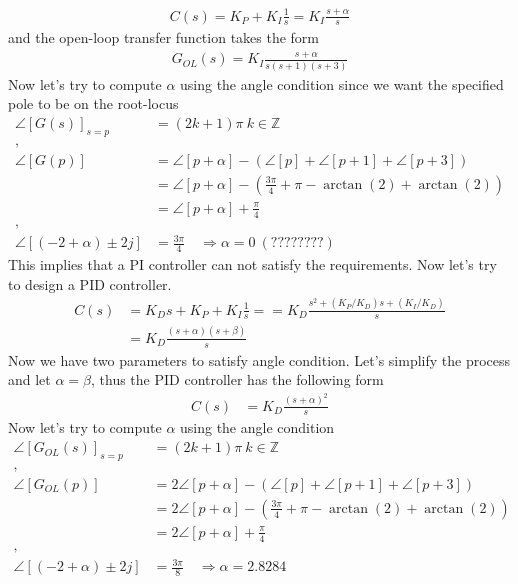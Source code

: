 \documentclass[twoside]{article}
\begin{document}
%
\begin{align*}
 C(s) = K_P + K_I \frac{1}{s} = K_I \frac{s + \alpha}{s}
\end{align*}
% 
and the open-loop transfer function takes the form
%
\begin{align*}
  G_{OL}(s) = K_I \frac{s + \alpha}{s (s+1) (s+3)}
\end{align*}
%
Now let's try to compute $\alpha$ using the angle condition
since we want the specified pole to be on the root-locus
%
\begin{align*}
  \angle [ G(s) ]_{s=p} &= (2 k + 1) \pi \ k \in \mathbb{Z}
\\
,
\\
  \angle [ G(p) ] &= \angle [ p + \alpha ] - \left( \angle [ p ] +
  \angle [ p + 1 ] + \angle [ p +  3] \right) 
\\
&= \angle [ p + \alpha ]  - \left( \frac{3 \pi}{4} + \pi - \arctan(2)
  + \arctan(2) \right) 
\\
&= \angle [ p + \alpha ]  + \frac{\pi}{4} 
\\
,
\\
\angle [ (-2 + \alpha) \pm 2 j ] &= \frac{3 \pi}{4} \quad \Rightarrow
                                   \alpha = 0 \ (????????)
\end{align*}
% 
This implies that a PI controller can not satisfy the requirements.
Now let's try to design a PID controller. 
%
\begin{align*}
 C(s) &= K_D s + K_P + K_I \frac{1}{s} = 
= K_D  \frac{ s^2 +   (K_P/K_D) s  + (K_I/K_D)  }{s}
\\
&= K_D \frac{ (s+\alpha) (s + \beta) }{s}
\end{align*}
%
Now we have two parameters to satisfy angle condition. Let's simplify
the process and let $\alpha = \beta$, thus the PID controller has the
following form
%
\begin{align*}
 C(s) 
&= K_D \frac{(s+\alpha)^2}{s}
\end{align*}
%
Now let's try to compute $\alpha$ using the angle condition
%
\begin{align*}
  \angle [ G_{OL}(s) ]_{s=p} &= (2 k + 1) \pi \ k \in \mathbb{Z}
\\
,
\\
  \angle [ G_{OL}(p) ] &= 2 \angle [ p + \alpha ] - \left( \angle [ p ] +
  \angle [ p + 1 ] + \angle [ p +  3] \right) 
\\
&= 2 \angle [ p + \alpha ]  - \left( \frac{3 \pi}{4} + \pi - \arctan(2)
  + \arctan(2) \right) 
\\
&= 2 \angle [ p + \alpha ]  + \frac{\pi}{4} 
\\
,
\\
\angle [ (-2 + \alpha) \pm 2 j ] &= \frac{3 \pi}{8} \quad \Rightarrow
                                   \alpha = 2.8284 
\end{align*}
\end{document}

